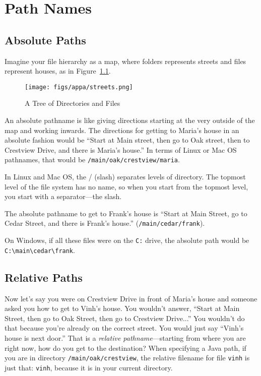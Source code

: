 \chapter{Path Names}
\label{pathnames}

\section{Absolute Paths}
Imagine your file hierarchy as a map, where folders represents streets and files represent houses, as in Figure~\ref{fig.files}.

\begin{figure}[!ht]
\begin{center}
\texttt{[image: figs/appa/streets.png]}
\caption{A Tree of Directories and Files}
\label{fig.files}
\end{center}
\end{figure}

An absolute pathname is like giving directions starting at the very outside of the map and working inwards. The directions for getting to Maria's house in an absolute fashion would be ``Start at Main street, then go to Oak street, then to Crestview Drive, and there is Maria's house.'' In terms of Linux or Mac OS pathnames, that would be \texttt{/main/oak/crestview/maria}.

In Linux and Mac OS, the / (slash) separates levels of directory. The topmost level of the file system has no name, so when you start from the topmost level, you start with a separator---the slash.

The absolute pathname to get to Frank's house is ``Start at Main Street, go to Cedar Street, and there is Frank's house.'' (\texttt{/main/cedar/frank}).

On Windows, if all these files were on the \texttt{C:} drive, the absolute path would be \texttt{C:\textbackslash main\textbackslash cedar\textbackslash frank}.

\section{Relative Paths}

Now let's say you were on Crestview Drive in front of Maria's house and someone asked you how to get to Vinh's house. You wouldn't answer, ``Start at Main Street, then go to Oak Street, then go to Crestview Drive...'' You wouldn't do that because you're already on the correct street. You would just say ``Vinh's house is next door.'' That is a {\em relative pathname}---starting from where you are right now, how do you get to the destination? When specifying a Java path, if you are in directory \texttt{/main/oak/crestview}, the relative filename for file \texttt{vinh} is just that: \texttt{vinh}, because it is in your current directory.

